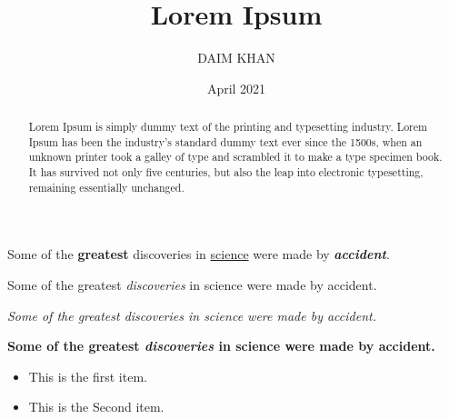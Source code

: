 \documentclass[12pt, a4paper ]{article}
\title{Lorem Ipsum}
\author{DAIM KHAN}
\date{April 2021}
\begin{document}
\maketitle
\tableofcontents


\begin{abstract}

Lorem Ipsum is simply dummy text of the printing and typesetting industry. Lorem Ipsum has been the industry's standard dummy text ever since the 1500s, when an unknown printer took a galley of type and scrambled it to make a type specimen book. It has survived not only five centuries, but also the leap into electronic typesetting, remaining essentially unchanged. 

\end{abstract}



\newline
Some of the \textbf{greatest}
discoveries in \underline{science} 
were made by \textbf{\textit{accident}}.


Some of the greatest \emph{discoveries} 
in science 
were made by accident.

\textit{Some of the greatest \emph{discoveries} 
in science 
were made by accident.}

\textbf{Some of the greatest \emph{discoveries} 
in science 
were made by accident.}








\begin{itemize}
  \item This is the first item.
  \item This is the Second item.
\end{itemize}



\end{document}
